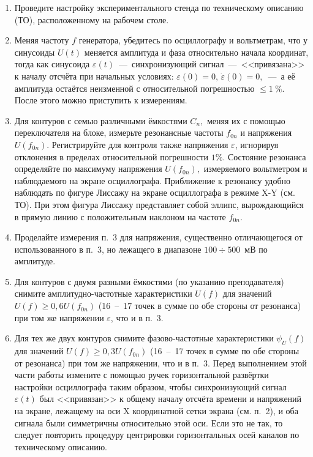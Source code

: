\begin{lab:task}
	\begin{enumerate}

    \item Проведите настройку экспериментального стенда по техническому описанию (ТО), расположенному на рабочем столе.

    \item Меняя частоту $f$ генератора, убедитесь по осциллографу и вольтметрам, что у синусоиды $U(t)$ меняется амплитуда и фаза относительно начала координат, тогда как синусоида $\varepsilon(t)$~---~синхронизующий сигнал~---~<<привязана>> к началу отсчёта при начальных условиях: $\varepsilon(0)=0$, $\dot{\varepsilon}(0)=0,$~---~а её амплитуда остаётся неизменной с относительной погрешностью  $\le1~\%$. После этого можно приступить к измерениям.

    \item Для контуров с семью различными ёмкостями $C_n,$ меняя их с помощью переключателя на блоке, измерьте резонансные частоты $f_{0n}$ и напряжения $U(f_{0n}).$ Регистрируйте для контроля также напряжения $\varepsilon$, игнорируя отклонения в пределах относительной погрешности $1\%$. Состояние резонанса определяйте по максимуму напряжения $U(f_{0n}),$ измеряемого вольтметром и наблюдаемого на экране осциллографа. Приближение к резонансу удобно наблюдать по фигуре Лиссажу на экране осциллографа в режиме X-Y (см. ТО). При этом фигура Лиссажу представляет собой эллипс, вырождающийся в прямую линию с положительным наклоном  на частоте $f_{0n}.$

    \item {} Проделайте измерения п.~3 для напряжения, существенно отличающегося от использованного в п.~3, но лежащего в диапазоне $100\div500$~мВ по амплитуде.

    \item Для контуров с двумя разными ёмкостями (по указанию преподавателя) снимите амплитудно-частотные характеристики $U(f)$ для значений $U(f)\ge0,6U(f_{0n})$ (16~--~17 точек в сумме по обе стороны от резонанса) при том же напряжении $\varepsilon$, что и в п.~3.

    \item Для тех же двух контуров снимите фазово-частотные характеристики $\psi_U(f)$ для значений $U(f)\ge0,3U(f_{0n})$ (16~--~17 точек в сумме по обе стороны от резонанса) при том же напряжении, что и в п.~3. Перед выполнением этой части работы измените с помощью ручек горизонтальной развёртки настройки осциллографа таким образом, чтобы синхронизующий сигнал $\varepsilon(t)$ был <<привязан>> к общему началу отсчёта времени и напряжений на экране, лежащему на оси X координатной сетки экрана (см. п.~2), и оба сигнала были симметричны относительно этой оси. Если это не так, то следует повторить процедуру центрировки горизонтальных осей каналов по техническому описанию.


\end{enumerate}
\end{lab:task}
